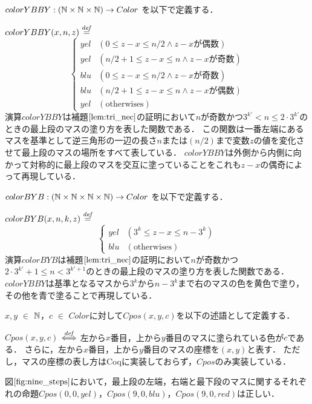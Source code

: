 \begin{dfn}[$colorYBBY$]
  $colorYBBY : (\mathbb{N} \times \mathbb{N} \times \mathbb{N}) \to Color$ を以下で定義する．

  $colorYBBY(x,n,z) \overset{{\it def}}{=}$
  \[
  \begin{cases}
    yel & (0 \leq z-x \leq n/2 \land z-x\text{が偶数}) \\
    yel & (n/2+1 \leq z-x \leq n \land z-x\text{が奇数}) \\
    blu & (0 \leq z-x \leq n/2 \land z-x\text{が奇数}) \\
    blu & (n/2+1 \leq z-x \leq n \land z-x\text{が偶数}) \\
    yel & (\text{otherwises})
  \end{cases}
  \]
  演算$colorYBBY$は補題$\ref{lem:tri_nec}$の証明において$n$が奇数かつ$3^{k'} < n \leq 2 \cdot 3^{k'}$のときの最上段のマスの塗り方を表した関数である．
  この関数は一番左端にあるマスを基準として逆三角形の一辺の長さ$n$または$(n/2)$まで変数$z$の値を変化させて最上段のマスの場所をすべて表している．
  $colorYBBY$は外側から内側に向かって対称的に最上段のマスを交互に塗っていることをこれも$z-x$の偶奇によって再現している．
\end{dfn}
\begin{dfn}[$colorBYB$]
  $colorBYB : (\mathbb{N} \times \mathbb{N} \times \mathbb{N} \times \mathbb{N} ) \to Color$ を以下で定義する．

  $colorBYB(x,n,k,z) \overset{{\it def}}{=}$
  \[
  \begin{cases}
    yel & (3^k \leq z-x \leq n-3^k) \\
    blu & (\text{otherwises})
  \end{cases}
  \]
  演算$colorBYB$は補題$\ref{lem:tri_nec}$の証明において$n$が奇数かつ$2 \cdot 3^{k'} + 1 \leq n < 3^{k'+1}$のときの最上段のマスの塗り方を表した関数である．
  $colorYBBY$は基準となるマスから$3^k$から$n-3^k$まで右のマスの色を黄色で塗り，
  その他を青で塗ることで再現している．
\end{dfn}
\begin{dfn}[$Cpos$]
  $x, y$ $\in$ $\mathbb{N}$，$c$ $\in$ $Color$に対して$Cpos(x,y,c)$を以下の述語として定義する．
  
  $Cpos(x,y,c)$ $\overset{{\it def}}{\Longleftrightarrow}$
  左から$x$番目，上から$y$番目のマスに塗られている色が$c$である．
  さらに，左から$x$番目，上から$y$番目のマスの座標を$(x,y)$と表す．
  ただし，マスの座標の表し方はCoqに実装しておらず，$Cpos$のみ実装している．
\end{dfn}
\begin{exm}
  図$\ref{fig:nine_steps}$において，最上段の左端，右端と最下段のマスに関するそれぞれの命題$Cpos(0,0,yel)$，$Cpos(9,0,blu)$，$Cpos(9,0,red)$は正しい．
\end{exm}
